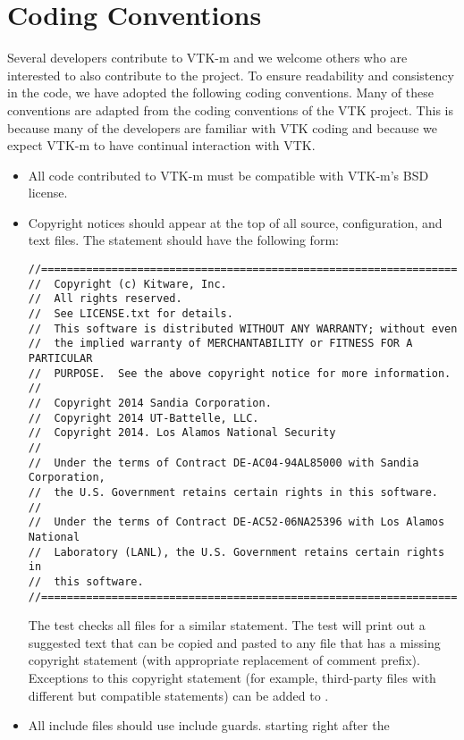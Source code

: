 
\chapter{Coding Conventions}
\label{chap:CodingConventions}

Several developers contribute to VTK-m and we welcome others who are
interested to also contribute to the project. To ensure readability and
consistency in the code, we have adopted the following coding
conventions. Many of these conventions are adapted from the coding
conventions of the VTK project. This is because many of the developers are
familiar with VTK coding and because we expect VTK-m to have continual
interaction with VTK.

\begin{itemize}
\item All code contributed to VTK-m must be compatible with VTK-m's BSD
  license.
\item Copyright notices should appear at the top of all source,
  configuration, and text files. The statement should have the following
  form:
\small\begin{verbatim}
//============================================================================
//  Copyright (c) Kitware, Inc.
//  All rights reserved.
//  See LICENSE.txt for details.
//  This software is distributed WITHOUT ANY WARRANTY; without even
//  the implied warranty of MERCHANTABILITY or FITNESS FOR A PARTICULAR
//  PURPOSE.  See the above copyright notice for more information.
//
//  Copyright 2014 Sandia Corporation.
//  Copyright 2014 UT-Battelle, LLC.
//  Copyright 2014. Los Alamos National Security
//
//  Under the terms of Contract DE-AC04-94AL85000 with Sandia Corporation,
//  the U.S. Government retains certain rights in this software.
//
//  Under the terms of Contract DE-AC52-06NA25396 with Los Alamos National
//  Laboratory (LANL), the U.S. Government retains certain rights in
//  this software.
//============================================================================
\end{verbatim}
  The  test checks all files for a similar
  statement. The test will print out a suggested text that can be copied
  and pasted to any file that has a missing copyright statement (with
  appropriate replacement of comment prefix). Exceptions to this copyright
  statement (for example, third-party files with different but compatible
  statements) can be added to .
\item All include files should use include guards. starting right after the

\end{itemize}
